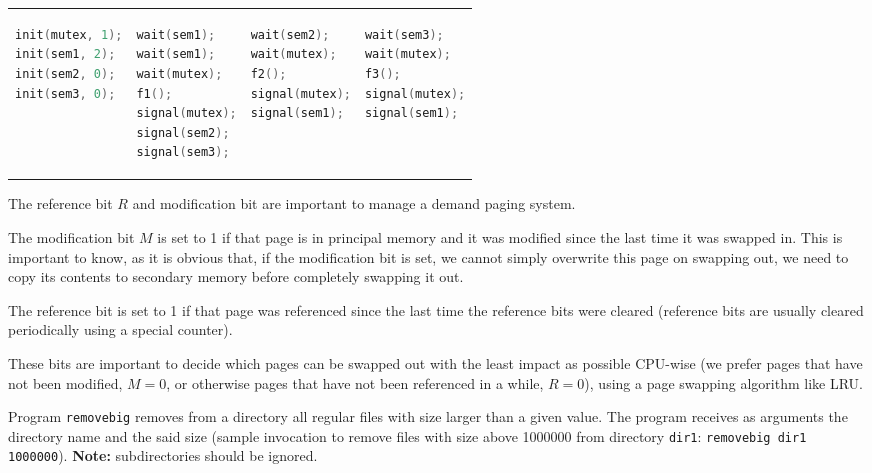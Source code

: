 \documentclass{sope}
\begin{document}
\begin{center}
    \lstset{
        numbers=none,
        showlines=true
    }
    \begin{tabular}{p{35mm} | p{35mm} | p{35mm} | p{35mm}}
        \begin{lstlisting}[language=C]
init(mutex, 1);
init(sem1, 2);
init(sem2, 0);
init(sem3, 0);



        \end{lstlisting} &
        \begin{lstlisting}[language=C]
wait(sem1);
wait(sem1);
wait(mutex);
f1();
signal(mutex);
signal(sem2);
signal(sem3);
        \end{lstlisting} &
        \begin{lstlisting}[language=C]
wait(sem2);
wait(mutex);
f2();
signal(mutex);
signal(sem1);


        \end{lstlisting} &
        \begin{lstlisting}[language=C]
wait(sem3);
wait(mutex);
f3();
signal(mutex);
signal(sem1);


        \end{lstlisting}
    \end{tabular}
\end{center}

The reference bit $R$ and modification bit are important to manage a demand paging system.

The modification bit $M$ is set to 1 if that page is in principal memory and it was modified since the last time it was swapped in. This is important to know, as it is obvious that, if the modification bit is set, we cannot simply overwrite this page on swapping out, we need to copy its contents to secondary memory before completely swapping it out.

The reference bit is set to 1 if that page was referenced since the last time the reference bits were cleared (reference bits are usually cleared periodically using a special counter).

These bits are important to decide which pages can be swapped out with the least impact as possible CPU-wise (we prefer pages that have not been modified, $M=0$, or otherwise pages that have not been referenced in a while, $R=0$), using a page swapping algorithm like LRU.

Program \texttt{removebig} removes from a directory all regular files with size larger than a given value. The program receives as arguments the directory name and the said size (sample invocation to remove files with size above 1000000 from directory \texttt{dir1}: \texttt{removebig dir1 1000000}). \textbf{Note:} subdirectories should be ignored.
\end{document}
